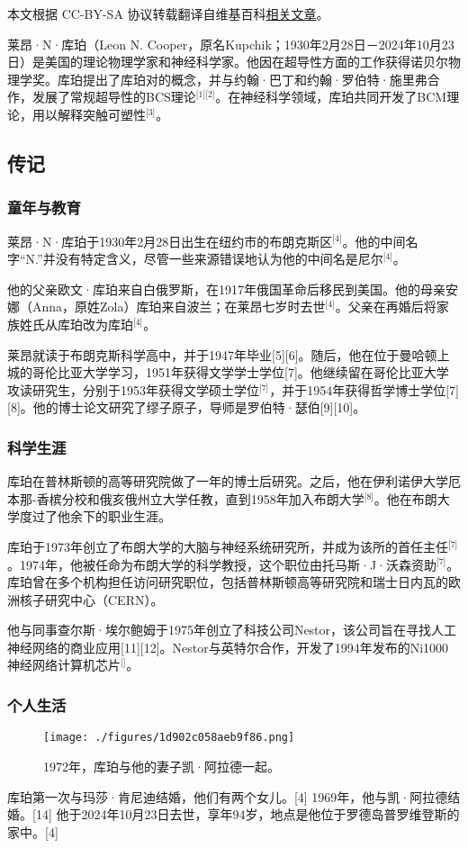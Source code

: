 
本文根据 CC-BY-SA 协议转载翻译自维基百科\href{https://en.wikipedia.org/wiki/Leon_Cooper}{相关文章}。

莱昂·N·库珀（Leon N. Cooper，原名Kupchik；1930年2月28日－2024年10月23日）是美国的理论物理学家和神经科学家。他因在超导性方面的工作获得诺贝尔物理学奖。库珀提出了库珀对的概念，并与约翰·巴丁和约翰·罗伯特·施里弗合作，发展了常规超导性的BCS理论\(^\text{[1][2]}\)。在神经科学领域，库珀共同开发了BCM理论，用以解释突触可塑性\(^\text{[3]}\)。
\subsection{传记}
\subsubsection{童年与教育}
莱昂·N·库珀于1930年2月28日出生在纽约市的布朗克斯区\(^\text{[4]}\)。他的中间名字“N.”并没有特定含义，尽管一些来源错误地认为他的中间名是尼尔\(^\text{[4]}\)。

他的父亲欧文·库珀来自白俄罗斯，在1917年俄国革命后移民到美国。他的母亲安娜（Anna，原姓Zola）库珀来自波兰；在莱昂七岁时去世\(^\text{[4]}\)。父亲在再婚后将家族姓氏从库珀改为库珀\(^\text{[4]}\)。

莱昂就读于布朗克斯科学高中，并于1947年毕业[5][6]。随后，他在位于曼哈顿上城的哥伦比亚大学学习，1951年获得文学学士学位[7]。他继续留在哥伦比亚大学攻读研究生，分别于1953年获得文学硕士学位\(^\text{[7]}\)，并于1954年获得哲学博士学位[7][8]。他的博士论文研究了缪子原子，导师是罗伯特·瑟伯[9][10]。
\subsubsection{科学生涯}
库珀在普林斯顿的高等研究院做了一年的博士后研究。之后，他在伊利诺伊大学厄本那-香槟分校和俄亥俄州立大学任教，直到1958年加入布朗大学\(^\text{[8]}\)。他在布朗大学度过了他余下的职业生涯。

库珀于1973年创立了布朗大学的大脑与神经系统研究所，并成为该所的首任主任\(^\text{[7]}\)。1974年，他被任命为布朗大学的科学教授，这个职位由托马斯·J·沃森资助\(^\text{[7]}\)。库珀曾在多个机构担任访问研究职位，包括普林斯顿高等研究院和瑞士日内瓦的欧洲核子研究中心（CERN）。

他与同事查尔斯·埃尔鲍姆于1975年创立了科技公司Nestor，该公司旨在寻找人工神经网络的商业应用[11][12]。Nestor与英特尔合作，开发了1994年发布的Ni1000神经网络计算机芯片\(^\text{[]}\)。
\subsubsection{个人生活}
\begin{figure}[ht]
\centering
\texttt{[image: ./figures/1d902c058aeb9f86.png]}
\caption{1972年，库珀与他的妻子凯·阿拉德一起。} \label{fig_LAkb_1}
\end{figure}
库珀第一次与玛莎·肯尼迪结婚，他们有两个女儿。[4] 1969年，他与凯·阿拉德结婚。[14] 他于2024年10月23日去世，享年94岁，地点是他位于罗德岛普罗维登斯的家中。[4]
